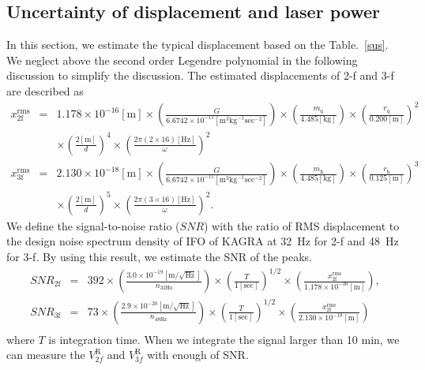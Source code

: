 \documentclass[A4]{spie}  %
\begin{document}
\subsection{Uncertainty of displacement and  laser power}
In this section, we estimate the typical displacement based on the Table.~\ref{sus}. We neglect above the second order Legendre polynomial in the following discussion to simplify the discussion. 
 The estimated displacements of 2-f and 3-f are described as
\begin{eqnarray}
x^{\mathrm{rms}}_{\mathrm{2f}}&=&1.178 \times 10^{-16}\mathrm{[m]} \times \left( \frac{G}{6.6742 \times 10^{-11} \mathrm{[m^3kg^{-1}sec^{-2}]}} \right) \times \left( \frac{m_{\mathrm{q}}}{4.485 \mathrm{[kg]}} \right) \times \left( \frac{r_{\mathrm{q}}}{0.200 \mathrm{[m]}} \right)^2 \nonumber \\
 &&\times \left( \frac{2\mathrm{[m]}}{d} \right)^4 \times \left( \frac{2\pi(2\times 16)\mathrm{[Hz]}}{\omega} \right)^2\\
x^{\mathrm{rms}}_{\mathrm{3f}}&=&2.130 \times 10^{-18}\mathrm{[m]} \times \left( \frac{G}{6.6742 \times 10^{-11} \mathrm{[m^3kg^{-1}sec^{-2}]}} \right) \times \left( \frac{m_{\mathrm{h}}}{4.485 \mathrm{[kg]}} \right) \times \left( \frac{r_{\mathrm{h}}}{0.125 \mathrm{[m]}} \right)^3 \nonumber \\
 &&\times \left( \frac{2\mathrm{[m]}}{d} \right)^5 \times \left( \frac{2\pi(3\times 16)\mathrm{[Hz]}}{\omega} \right)^2.
\end{eqnarray}
We define the signal-to-noise ratio ($\!S\!N\!R$) with the ratio of RMS displacement to the design noise spectrum density of IFO of KAGRA at 32~Hz for 2-f and 48~Hz for 3-f.
By using this result, we estimate the SNR of the peaks.
\begin{eqnarray}
\!S\!N\!R_{\mathrm{2f}}&=&392 \times \left(\frac{3.0 \times 10^{-19} [\mathrm{m/\sqrt{Hz}}]}{n_{\mathrm{32Hz}}} \right) \times \left(\frac{T}{1 [\mathrm{sec}]} \right)^{1/2} \times \left(\frac{x_{\mathrm{2f}}^{\mathrm{rms}}}{1.178 \times 10^{-16}\mathrm{[m]} }  \right),   \\
\!S\!N\!R_{\mathrm{3f}}&=&73 \times \left(\frac{2.9 \times 10^{-20} [\mathrm{m/\sqrt{Hz}}]}{n_{\mathrm{48Hz}}} \right) \times \left(\frac{T}{1 [\mathrm{sec}]} \right)^{1/2} \times \left(\frac{x_{\mathrm{2f}}^{\mathrm{rms}}}{2.130 \times 10^{-18}\mathrm{[m] }} \right)   \\
\end{eqnarray}
where $T$ is integration time. When we integrate the signal larger than 10 min, we can measure the $V^{\mathrm{R}}_{2f}$ and $V^{\mathrm{R}}_{3f}$ with enough of SNR.
\end{document}
